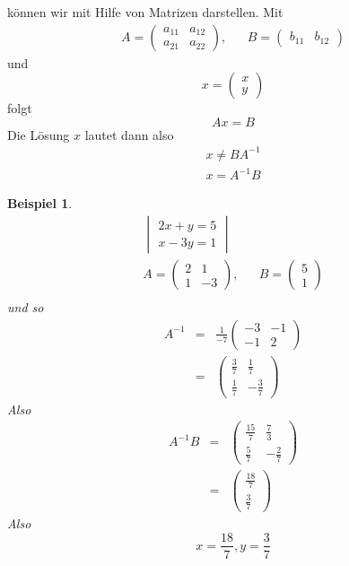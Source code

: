 \documentclass[a4paper,10pt]{report}
\newtheorem{myexample}{Beispiel}
\begin{document}
können wir mit Hilfe von Matrizen darstellen. Mit
\begin{eqnarray*}
A=\begin{pmatrix}a_{11} & a_{12}\\a_{21}&a_{22}\end{pmatrix}, && B=\begin{pmatrix}b_{11} & b_{12}\end{pmatrix}
\end{eqnarray*}
und 
\begin{equation*}
x=\begin{pmatrix}x\\y\end{pmatrix}
\end{equation*}
folgt
\begin{equation*}
Ax=B
\end{equation*}
Die Lösung $x$ lautet dann also
\begin{eqnarray*}
x\neq BA^{-1}\\
x = A^{-1}B
\end{eqnarray*}
\begin{myexample}
\begin{eqnarray*}
\begin{vmatrix}2x+y=5\\x-3y=1\end{vmatrix}\\
A=\begin{pmatrix}2&1\\1 &-3\end{pmatrix}, && B=\begin{pmatrix}5\\1\end{pmatrix}\\
\end{eqnarray*}
und so
\begin{eqnarray*}
A^{-1} &=& \frac{1}{-7}\begin{pmatrix}-3&-1\\-1&2\end{pmatrix}\\
&=&\begin{pmatrix}\frac{3}{7}&\frac{1}{7}\\\frac{1}{7}&-\frac{3}{7}\end{pmatrix}
\end{eqnarray*}
Also
\begin{eqnarray*}
A^{-1}B &=& \begin{pmatrix}\frac{15}{7} & \frac{7}{3}\\\frac{5}{7}& -\frac{2}{7} \end{pmatrix}\\
&=& \begin{pmatrix}\frac{18}{7}\\\frac{3}{7}\end{pmatrix}
\end{eqnarray*}
Also
\begin{equation*}
x=\frac{18}{7}, y=\frac{3}{7}
\end{equation*}
\end{myexample}
\newpage
\end{document}
